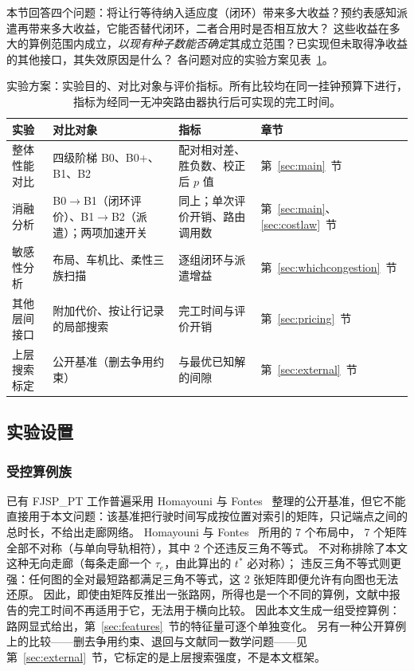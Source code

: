 \documentclass[manuscript,screen,review]{acmart}
\newcommand{\PubNLayout}{7}
\newcommand{\PubNLayoutAsym}{7}           %
\newcommand{\PubNLayoutBad}{2}            %
\begin{document}
本节回答四个问题：将让行等待纳入适应度（闭环）带来多大收益？预约表感知派遣再带来多大收益，它能否替代闭环，二者合用时是否相互放大？
这些收益在多大的算例范围内成立，\emph{以现有种子数能否确定}其成立范围？已实现但未取得净收益的其他接口，其失效原因是什么？
各问题对应的实验方案见表~\ref{tab:plan}。

\begin{table}[t]
\caption{实验方案：实验目的、对比对象与评价指标。所有比较均在同一挂钟预算下进行，指标为经同一无冲突路由器执行后可实现的完工时间。}
\label{tab:plan}
\footnotesize
\begin{tabular}{@{}p{2.2cm}p{3.6cm}p{3.6cm}p{1.6cm}@{}}
\toprule
实验 & 对比对象 & 指标 & 章节 \\
\midrule
整体性能对比 & 四级阶梯 B0、B0+、B1、B2 & 配对相对差、胜负数、校正后 $p$ 值 & 第~\ref{sec:main}~节 \\
消融分析 & B0$\to$B1（闭环评价）、B1$\to$B2（派遣）；两项加速开关 & 同上；单次评价开销、路由调用数 & 第~\ref{sec:main}、\ref{sec:costlaw}~节 \\
敏感性分析 & 布局、车机比、柔性三族扫描 & 逐组闭环与派遣增益 & 第~\ref{sec:whichcongestion}~节 \\
其他层间接口 & 附加代价、按让行记录的局部搜索 & 完工时间与评价开销 & 第~\ref{sec:pricing}~节 \\
上层搜索标定 & 公开基准（删去争用约束） & 与最优已知解的间隙 & 第~\ref{sec:external}~节 \\
\bottomrule
\end{tabular}
\end{table}

\subsection{实验设置}
\label{sec:instances}

\subsubsection{受控算例族}
已有 FJSP\_PT 工作普遍采用 Homayouni 与 Fontes~\cite{homayouni2021production} 整理的公开基准，但它不能直接用于本文问题：该基准把行驶时间写成按位置对索引的矩阵，只记端点之间的总时长，不给出走廊网络。
Homayouni 与 Fontes~\cite{homayouni2021production} 所用的 \PubNLayout{} 个布局中，
\PubNLayoutAsym{} 个矩阵全部不对称（与单向导轨相符），其中 \PubNLayoutBad{} 个还违反三角不等式。
不对称排除了本文这种无向走廊（每条走廊一个 $\tau_e$，由此算出的 $t^{*}$ 必对称）；
违反三角不等式则更强：任何图的全对最短路都满足三角不等式，这 \PubNLayoutBad{} 张矩阵即便允许有向图也无法还原。
因此，即使由矩阵反推出一张路网，所得也是一个不同的算例，文献中报告的完工时间不再适用于它，无法用于横向比较。
因此本文生成一组受控算例：路网显式给出，第~\ref{sec:features}~节的特征量可逐个单独变化。
另有一种公开算例上的比较——删去争用约束、退回与文献同一数学问题——见第~\ref{sec:external}~节，它标定的是上层搜索强度，不是本文框架。
\end{document}
